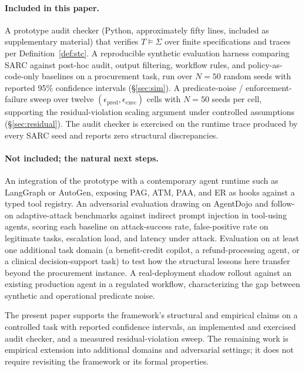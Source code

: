 \documentclass[11pt,a4paper]{article}
\theoremstyle{remark}
\begin{document}
\paragraph{Included in this paper.} A prototype audit checker (Python, approximately fifty lines, included as supplementary material) that verifies $T \models \Sigma$ over finite specifications and traces per Definition~\ref{def:stc}. A reproducible synthetic evaluation harness comparing SARC against post-hoc audit, output filtering, workflow rules, and policy-as-code-only baselines on a procurement task, run over $N=50$ random seeds with reported 95\% confidence intervals (\S\ref{sec:sim}). A predicate-noise / enforcement-failure sweep over twelve $(\epsilon_{\text{pred}}, \epsilon_{\text{exec}})$ cells with $N=50$ seeds per cell, supporting the residual-violation scaling argument under controlled assumptions (\S\ref{sec:residual}). The audit checker is exercised on the runtime trace produced by every SARC seed and reports zero structural discrepancies.

\paragraph{Not included; the natural next steps.} An integration of the prototype with a contemporary agent runtime such as LangGraph or AutoGen, exposing PAG, ATM, PAA, and ER as hooks against a typed tool registry. An adversarial evaluation drawing on AgentDojo \cite{debenedetti2024agentdojo} and follow-on adaptive-attack benchmarks against indirect prompt injection in tool-using agents, scoring each baseline on attack-success rate, false-positive rate on legitimate tasks, escalation load, and latency under attack. Evaluation on at least one additional task domain (a benefit-credit copilot, a refund-processing agent, or a clinical decision-support task) to test how the structural lessons here transfer beyond the procurement instance. A real-deployment shadow rollout against an existing production agent in a regulated workflow, characterizing the gap between synthetic and operational predicate noise.

The present paper supports the framework's structural and empirical claims on a controlled task with reported confidence intervals, an implemented and exercised audit checker, and a measured residual-violation sweep. The remaining work is empirical extension into additional domains and adversarial settings; it does not require revisiting the framework or its formal properties.
\end{document}
